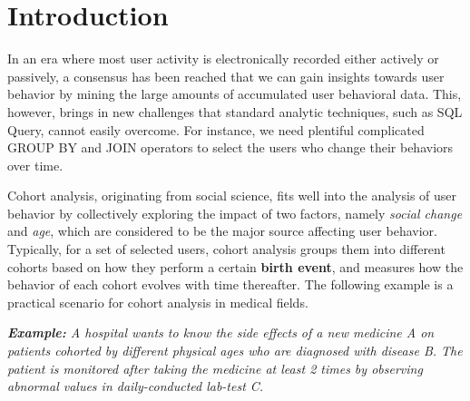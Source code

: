 \section{Introduction}
%
In an era where most user activity is electronically recorded either actively or passively, a consensus has been reached that we can gain insights towards user behavior by mining the large amounts of accumulated user behavioral data.
This, however, brings in new challenges that standard analytic techniques, such as SQL Query, cannot easily overcome. 
For instance, we need plentiful complicated GROUP BY and JOIN operators to select the users who change their behaviors over time.


Cohort analysis, originating from social science\cite{glenn2005cohort}, fits well into the analysis of user behavior by collectively exploring the impact of two factors, namely \emph{social change} and \emph{age}, which are considered to be the major source affecting user behavior. Typically, for a set of selected users, cohort analysis groups them into different cohorts based on how they perform a certain \textbf{birth event}, and measures how the behavior of each cohort evolves with time thereafter.
The following example is a practical scenario for cohort analysis in medical fields.

\emph{\textbf{Example:} A hospital wants to know the side effects of a new medicine A on patients cohorted by different physical ages who are diagnosed with disease B. The patient is monitored after taking the medicine at least 2 times by observing abnormal values in daily-conducted lab-test C.}

